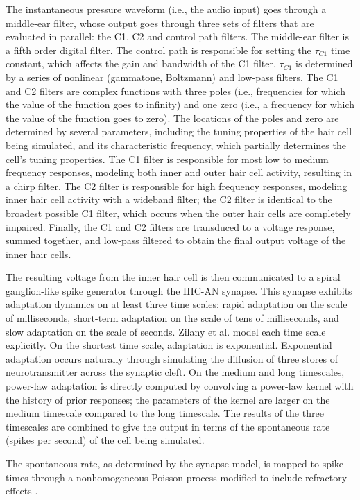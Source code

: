 \documentclass{article}
\begin{document}
The instantaneous pressure waveform
(i.e., the audio input)
goes through a middle-ear filter,
whose output goes through three sets of filters
that are evaluated in parallel:
the C1, C2 and control path filters.
The middle-ear filter is a fifth order digital filter.
The control path is responsible for
setting the $\tau_{C1}$ time constant,
which affects the gain and bandwidth
of the C1 filter.
$\tau_{C1}$ is determined by
a series of nonlinear
(gammatone, Boltzmann)
and low-pass filters.
The C1 and C2 filters are
complex functions with three poles
(i.e., frequencies for which the
value of the function goes to infinity)
and one zero (i.e., a frequency
for which the value of the function goes to zero).
The locations of the poles and zero
are determined by
several parameters, including
the tuning properties of
the hair cell being simulated,
and its characteristic frequency,
which partially determines the cell's
tuning properties.
The C1 filter is responsible for most
low to medium frequency responses,
modeling both inner and outer hair cell
activity, resulting in a chirp filter.
The C2 filter is responsible
for high frequency responses,
modeling inner hair cell activity
with a wideband filter;
the C2 filter is identical
to the broadest possible C1 filter,
which occurs when the outer hair cells
are completely impaired.
Finally, the C1 and C2 filters
are transduced to a voltage response,
summed together, and low-pass filtered
to obtain the final output voltage
of the inner hair cells.

The resulting voltage from the inner hair cell
is then communicated to
a spiral ganglion-like spike generator
through the IHC-AN synapse.
This synapse exhibits adaptation dynamics
on at least three time scales:
rapid adaptation on the scale of milliseconds,
short-term adaptation on the scale of tens of milliseconds,
and slow adaptation on the scale of seconds.
Zilany et al. model each time scale explicitly.
On the shortest time scale,
adaptation is exponential.
Exponential adaptation occurs naturally
through simulating the diffusion
of three stores of neurotransmitter
across the synaptic cleft.
On the medium and long timescales,
power-law adaptation is directly computed
by convolving a power-law kernel with
the history of prior responses;
the parameters of the kernel
are larger on the medium timescale
compared to the long timescale.
The results of the three timescales
are combined to give the output
in terms of the spontaneous rate
(spikes per second) of the cell being simulated.

The spontaneous rate,
as determined by the synapse model,
is mapped to spike times
through a nonhomogeneous Poisson process
modified to include refractory effects
\citep{zhang2001}.
\end{document}
